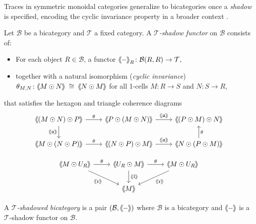 \documentclass[11pt,oneside]{amsart}
\numberwithin{equation}{section}
\numberwithin{figure}{section}
\theoremstyle{plain}
\theoremstyle{definition}
\theoremstyle{remark}
\newcommand{\shspace}{\hspace{.5mm}} %
\newcommand{\sh}[1]{{\ensuremath{\shspace\hspace{1mm}\makebox[-1mm]{$\langle$}\makebox[0mm]{$\langle$}\hspace{1mm}{#1}\makebox[1mm]{$\rangle$}\makebox[0mm]{$\rangle$}\shspace}}}
\begin{document}
 

Traces in symmetric monoidal categories generalize to bicategories once a \emph{shadow} is specified, encoding the cyclic invariance property in a broader context \cite{PON1}. 

\begin{definition}\label{def:classical_shadow}
Let $\mathcal{B}$ be a bicategory and $\mathcal{T}$ a fixed category.  
A \emph{$\mathcal{T}$-shadow functor} on $\mathcal{B}$ consists of:
\begin{itemize}
  \item For each object $R \in \mathcal{B}$, a functor
  \(
    \sh{-}_R \colon \mathcal{B}(R,R) \to \mathcal{T},
  \)
  \item together with a natural isomorphism (\emph{cyclic invariance})
  \(
    \theta_{M,N} \colon \sh{M \odot N} \;\cong\; \sh{N \odot M}
  \)
  for all 1-cells $M \colon R \to S$ and $N \colon S \to R$,
\end{itemize}
 that satisfies the hexagon and triangle coherence diagrams \[\begin{tikzcd}
\sh{ (M\odot N)\odot P }  \ar[r,"\theta"] \ar[d,"\sh{ \mathfrak{a} } "']  & \sh{ P\odot (M\odot N) } \ar[r, "\sh{\mathfrak{a}}" ] & \sh{ (P\odot M)\odot N } \\
  \sh{ M\odot (N\odot P) }  \ar[r,"\theta"]  &  \sh{(N\odot P)\odot M }\ar[r, "\sh{ \mathfrak{a} }"]& \sh{ N\odot (P\odot M) }\ar[u, "\theta"']
  \end{tikzcd}\]
  
\[ \begin{tikzcd}
  \sh{ M\odot  U_R}  \arrow[r,"\theta"] \arrow[rd,"\sh{\mathfrak{r}}"']&
  \sh{ U_R\odot M} \arrow[r,"\theta"]\arrow[d,"\sh{\mathfrak{l} }"] &\sh{ M\odot  U_R} \arrow[ld,"\sh{\mathfrak{r} }"]\\
  &   \sh{ M} &
    \end{tikzcd}\]
\end{definition}

\begin{definition}
A  \emph{$\mathcal{T}$-shadowed bicategory} is a pair $(\mathcal B,\sh{-})$ where $\mathcal B$ is a bicategory 
and $\sh{-}$ is a $\mathcal T$-shadow functor on $\mathcal B$.
\end{definition}
\end{document}
